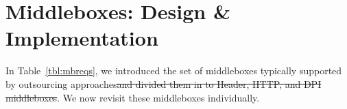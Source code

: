 \documentclass[letterpaper,twocolumn,10pt]{article}
\providecommand{\DIFdeltex}[1]{{\protect\color{red}\sout{#1}}}                      %
\providecommand{\DIFaddbegin}{} %
\providecommand{\DIFaddend}{} %
\providecommand{\DIFdelbegin}{} %
\providecommand{\DIFdelend}{} %
\providecommand{\DIFdel}[1]{\texorpdfstring{\DIFdeltex{#1}}{}} %
\begin{document}
%
%
%
%

\DIFaddbegin 


\DIFaddend \section{Middleboxes: Design \& Implementation}
\label{sec:mbs}

In Table~\ref{tbl:mbreqs}, we introduced the set of middleboxes typically supported by outsourcing approaches\DIFdelbegin \DIFdel{and divided them in to Header, HTTP, and DPI middleboxes}\DIFdelend . We now revisit these middleboxes individually. %
\end{document}
